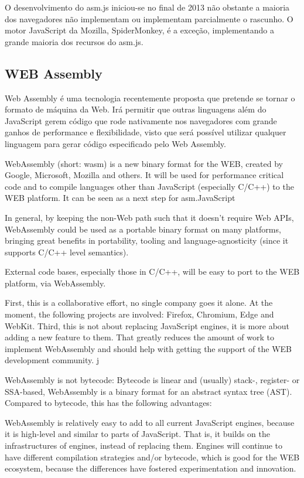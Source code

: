 O desenvolvimento do asm.js iniciou-se no final de 2013 não obstante a
maioria dos navegadores não implementam ou implementam parcialmente o
rascunho. O motor JavaScript da Mozilla, SpiderMonkey, é a exceção,
implementando a grande maioria dos recursos do asm.js.

\subsection{WEB Assembly}

Web Assembly é uma tecnologia recentemente proposta que pretende se tornar o formato de máquina da Web.
Irá permitir que outras linguagens além do JavaScript gerem código que rode nativamente nos navegadores com grande 
ganhos de performance e flexibilidade, visto que será possível utilizar qualquer linguagem para gerar código especificado pelo Web Assembly.

WebAssembly (short: wasm) is a new binary format for the WEB, created by Google, Microsoft, Mozilla and others. It will be used for performance critical code and to compile languages other than JavaScript (especially C/C++) to the WEB platform. It can be seen as a next step for asm.JavaScript 

In general, by keeping the non-Web path such that it doesn't require Web APIs, WebAssembly could be used as a portable binary format on many platforms, bringing great benefits in portability, tooling and language-agnosticity (since it supports C/C++ level semantics).


External code bases, especially those in C/C++, will be easy to port to the WEB platform, via WebAssembly.

First, this is a collaborative effort, no single company goes it alone. At the moment, the following projects are involved: Firefox, Chromium, Edge and WebKit.
Third, this is not about replacing JavaScript engines, it is more about adding a new feature to them. That greatly reduces the amount of work to implement WebAssembly and should help with getting the support of the WEB development community.
j

WebAssembly is not bytecode: Bytecode is linear and (usually) stack-, register- or SSA-based, WebAssembly is a binary format for an abstract syntax tree (AST). Compared to bytecode, this has the following advantages:

WebAssembly is relatively easy to add to all current JavaScript engines, because it is high-level and similar to parts of JavaScript. That is, it builds on the infrastructures of engines, instead of replacing them. Engines will continue to have different compilation strategies and/or bytecode, which is good for the WEB ecosystem, because the differences have fostered experimentation and innovation.

